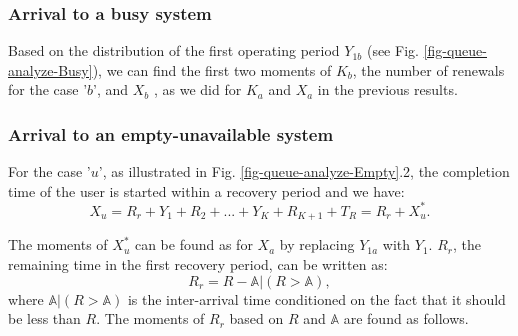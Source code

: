 \documentclass[11pt,journal,oneside,onecolumn,draftclsnofoot]{IEEEtran}
\begin{document}
\subsubsection{Arrival to a busy system}
Based on the distribution of the first operating period $Y_{1b}$ (see Fig. \ref{fig-queue-analyze-Busy}),
we can find the first two moments of $K_b$, the number of renewals for the case '$b$', and $X_b$ , as we did for $K_a$ and $X_a$ in the previous results. 


\subsubsection{Arrival to an empty-unavailable system}
\label{app:stats}
For the case '$u$', as illustrated in Fig. \ref{fig-queue-analyze-Empty}.2, the completion time of the user is started within a recovery period and we have: 
\begin{equation}
X_u=R_{r}+Y_{1}+R_2+...+Y_K+R_{K+1}+T_R = R_{r} +X_u^*.
\label{eq:X_u}
\end{equation}


The moments of $X_u^*$ can be found as for $X_a$ by replacing $Y_{1a}$ with $Y_1$. $R_{r}$, the remaining time in the first recovery period, can be written as:
\begin{equation}
R_{r}=R-\mathbb{A}|(R>\mathbb{A}),
\label{eq:R1u}
\end{equation}
where $\mathbb{A}|(R>\mathbb{A})$ is the inter-arrival time conditioned on the fact that it should be less than $R$. The moments of $R_r$ based on $R$ and $\mathbb{A}$ are found as follows. 
\end{document}
